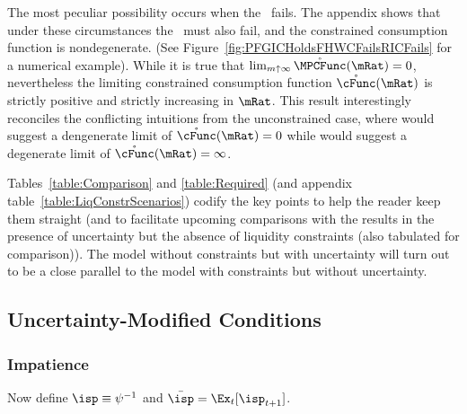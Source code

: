 \documentclass[BufferStockTheory]{subfiles}
\begin{document}
The most peculiar possibility occurs when the \RIC~fails.  The appendix shows that under these circumstances the \FHWC~must also fail, and the constrained consumption function is nondegenerate.  (See Figure~\ref{fig:PFGICHoldsFHWCFailsRICFails} for a numerical example).  While it is true that $\lim_{m \uparrow \infty}
\mathring{\MPCFunc}(\mRat) = 0$, nevertheless the limiting constrained
consumption function $\mathring{\cFunc}(\mRat)$ is strictly positive
and strictly increasing in $\mRat$.  This result interestingly
reconciles the conflicting intuitions from the unconstrained case,
where \cncl{\RIC} would suggest a dengenerate limit of
$\mathring{\cFunc}(\mRat)=0$ while \cncl{\FHWC} would suggest a
degenerate limit of $\mathring{\cFunc}(\mRat)=\infty$.

Tables~\ref{table:Comparison} and \ref{table:Required} (and appendix
table~\ref{table:LiqConstrScenarios}) codify the key points to help
the reader keep them straight (and to facilitate upcoming comparisons
with the results in the presence of uncertainty
but the absence of liquidity constraints (also tabulated for comparison)).  The model without constraints but with uncertainty will turn out to be a close parallel to the model with constraints but without uncertainty.

\hypertarget{Uncertainty-Modified-Conditions}{}
\subsection{Uncertainty-Modified Conditions}
\subsubsection{Impatience}



Now define $\isp \equiv \psi^{-1}$ and $\bar{\isp} = \Ex_{t}[\isp_{t+1}]$.  %
\end{document}
